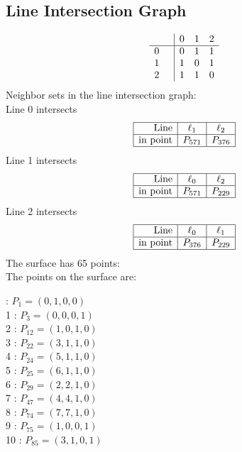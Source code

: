\documentclass{article}
\begin{document}
{\subsection*{Line Intersection Graph}
{\arraycolsep=1pt
$$
\begin{array}{rr|*{3}r}
 &  & 0 & 1 & 2\\
\hline
0 &  & 0 & 1 & 1\\
1 &  & 1 & 0 & 1\\
2 &  & 1 & 1 & 0\\
\end{array}
$$
}%
Neighbor sets in the line intersection graph:\\
Line 0 intersects 
$$
\begin{array}{|r*{2}{|c}|}
\hline
\mbox{Line}  & \ell_{1} & \ell_{2}\\
\hline
\mbox{in point}  & P_{571} & P_{376}\\
\hline
\end{array}
$$
Line 1 intersects 
$$
\begin{array}{|r*{2}{|c}|}
\hline
\mbox{Line}  & \ell_{0} & \ell_{2}\\
\hline
\mbox{in point}  & P_{571} & P_{229}\\
\hline
\end{array}
$$
Line 2 intersects 
$$
\begin{array}{|r*{2}{|c}|}
\hline
\mbox{Line}  & \ell_{0} & \ell_{1}\\
\hline
\mbox{in point}  & P_{376} & P_{229}\\
\hline
\end{array}
$$
The surface has 65 points:\\
The points on the surface are:\\
\begin{multicols}{3}
 : $P_{1}=( 0, 1, 0, 0 )$\\
1 : $P_{3}=( 0, 0, 0, 1 )$\\
2 : $P_{12}=( 1, 0, 1, 0 )$\\
3 : $P_{22}=( 3, 1, 1, 0 )$\\
4 : $P_{24}=( 5, 1, 1, 0 )$\\
5 : $P_{25}=( 6, 1, 1, 0 )$\\
6 : $P_{29}=( 2, 2, 1, 0 )$\\
7 : $P_{47}=( 4, 4, 1, 0 )$\\
8 : $P_{74}=( 7, 7, 1, 0 )$\\
9 : $P_{75}=( 1, 0, 0, 1 )$\\
10 : $P_{85}=( 3, 1, 0, 1 )$\\

\end{multicols}}
\end{document}
